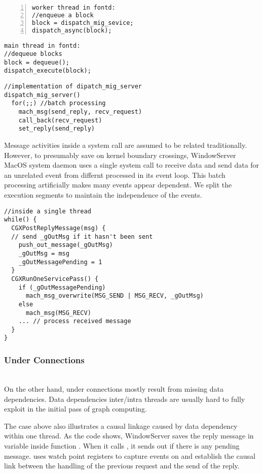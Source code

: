 {\footnotesize\begin{BVerbatim}[baseline=c,numbers=left]
worker thread in fontd:
//enqueue a block
block = dispatch_mig_sevice;
dispatch_async(block);
\end{BVerbatim}
}
\quad
{\footnotesize\begin{BVerbatim}[baseline=c]
main thread in fontd:
//dequeue blocks
block = dequeue();
dispatch_execute(block);
\end{BVerbatim}
}
	
{\verbatimfont{\itshape\ttfamily}\footnotesize\begin{BVerbatim}
//implementation of dipatch_mig_server
dispatch_mig_server()
  for(;;) //batch processing
    mach_msg(send_reply, recv_request)
    call_back(recv_request)
    set_reply(send_reply)
\end{BVerbatim}
}
\bigskip

Message activities inside a system call are assumed to be related traditionally.
However, to presumably save on kernel boundary crossings, WindowServer MacOS
system daemon uses a single system call to receive data and send data for an
unrelated event from differnt processed in its event loop. This batch processing
artificially makes many events appear dependent. We split the execution segments
to maintain the independence of the events.

{\footnotesize \begin{verbatim}
//inside a single thread
while() {
  CGXPostReplyMessage(msg) {
  // send _gOutMsg if it hasn't been sent
    push_out_message(_gOutMsg)
    _gOutMsg = msg
    _gOutMessagePending = 1
  }
  CGXRunOneServicePass() {
    if (_gOutMessagePending)
      mach_msg_overwrite(MSG_SEND | MSG_RECV, _gOutMsg)
    else
      mach_msg(MSG_RECV)
    ... // process received message
  }
}
\end{verbatim}
}

\subsubsection{Under Connections}\hfill\\
On the other hand, under connections mostly result from missing data
dependencies. Data dependencies inter/intra threads are usually hard to fully
exploit in the initial pass of graph computing.

The case above also illustrates a causal linkage caused by data dependency
within one thread. As the code shows, WindowServer saves the reply message in
variable  inside function . When it calls
, it sends out  if there is any pending
message. \xxx uses watch point registers to capture events on  and
establish the causal link between the handling of the previous request and the
send of the reply.

